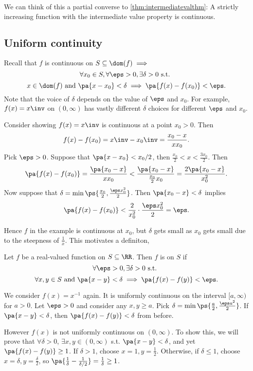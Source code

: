 \documentclass[11pt]{scrartcl}
\numberwithin{equation}{section}
\begin{document}
We can think of this a partial converse to \cref{thm:intermediatevalthm}:
A strictly increasing function with the intermediate value property 
is continuous.
\subsection{Uniform continuity}
Recall that $f$ is continuous on $S\subseteq\dom(f) \implies$
\[ \forall x_0\in S, \forall \eps>0, \exists \delta>0 \text{ s.t. } \]
\[ x\in\dom(f) \text{ and } \pa{x-x_0}<\delta\implies \pa{f(x)-f(x_0)}<\eps. \]
Note that the voice of $\delta$ depends on the value of $\eps$ and $x_0$.
For example, $f(x) = x\inv$ on $(0,\infty)$ has vastly different $\delta$
choices for different $\eps$ and $x_0$.

\begin{example}
Consider showing $f(x)=x\inv$ is continuous at a point $x_0>0$.
Then 
\[ f(x) - f(x_0) = x\inv - x_0\inv = \frac{x_0-x}{xx_0}.\]
Pick $\eps>0$. Suppose that $\pa{x-x_0} < x_0/2$, then $\frac{x_0}{2}<x<\frac{3x_0}{2}$. Then 
\[\pa{f(x) - f(x_0)} =\frac{\pa{x_0-x}}{xx_0} < \frac{\pa{x_0-x}}{\frac{x_0}{2}x_0} = \frac{2\pa{x_0-x}}{x_0^2}. \] 
Now suppose that $\delta=\min\ps{\frac{x_0}{2}, \frac{\eps x_0^2}{2}}$. 
Then $\pa{x_0-x} < \delta$ implies 
\[\pa{f(x)-f(x_0)} < \frac{2}{x_0^2}\cdot\frac{\eps x_0^2}{2}= \eps. \]
\end{example}
Hence $f$ in the example is continuous at $x_0$, but $\delta$ gets small as 
$x_0$ gets small due to the steepness of $\frac{1}{x}$.
This motivates a definiton, 

\begin{definition}
    Let $f$ be a real-valued function on $S\subseteq \RR$. Then $f$ is 
     on $S$ if 
    \[ \forall \eps>0, \exists \delta>0 \text{ s.t. }\]
    \[ \forall x,y\in S \text{ and } \pa{x-y} < \delta \implies \pa{f(x)-f(y)}< \eps.\]
\end{definition}

\begin{example}
    We consider $f(x) = x^{-1}$ again. It is uniformly continuous 
    on the interval $[a,\infty)$ for $a>0$. Let $\eps>0$ and consider any $x,y\geq a$. Pick $\delta=\min\ps{\frac{a}{2}, \frac{\eps a^2}{2}}$.
    If $\pa{x-y}<\delta$, then $\pa{f(x)-f(y)} <\delta$ from before.

    However $f(x)$ is not uniformly continuous on $(0,\infty)$.
    To show this, we will prove that 
    $\forall \delta>0$, $\exists x,y \in (0,\infty)$
    s.t. $\pa{x-y} < \delta$, and yet $\pa{f(x)-f(y)}\geq 1$.
    If $\delta>1$, choose $x=1, y=\frac{1}{2}$.
    Otherwise, if $\delta\leq 1$, choose $x=\delta, y=\frac{\delta}{2}$,
    so $\pa{\frac{1}{\delta}-\frac{1}{\delta/2}} = \frac{1}{\delta}\geq 1$.
\end{example}
\end{document}
